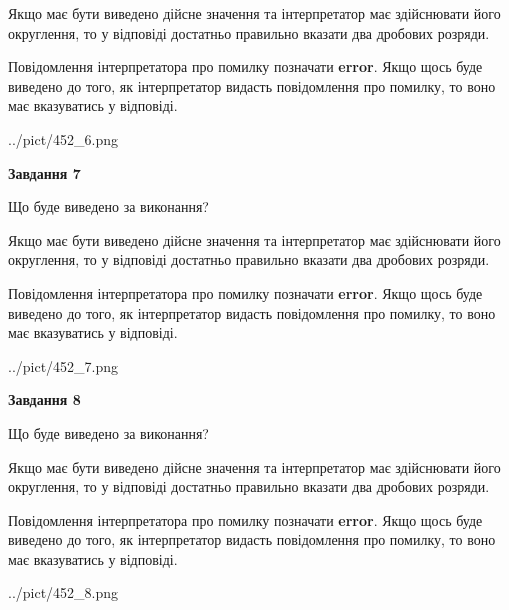 \documentclass[12pt, ukrainian]{article}
\begin{document}
{\begin {Large}
Якщо має бути виведено дійсне значення та інтерпретатор має здійснювати його округлення, 
то у відповіді достатньо правильно вказати два дробових розряди.

Повідомлення інтерпретатора про помилку позначати \textbf{error}.
Якщо щось буде виведено до того, як інтерпретатор видасть повідомлення про помилку, 
то воно має вказуватись у відповіді. \par

\begin{center}
	{../pict/452_6.png}
\end{center}
\newpage

{\begin {center}\textbf{Завдання 7}\end {center}}\par
Що буде виведено за виконання? \par

Якщо має бути виведено дійсне значення та інтерпретатор має здійснювати його округлення, 
то у відповіді достатньо правильно вказати два дробових розряди.

Повідомлення інтерпретатора про помилку позначати \textbf{error}.
Якщо щось буде виведено до того, як інтерпретатор видасть повідомлення про помилку, 
то воно має вказуватись у відповіді. \par

\begin{center}
	{../pict/452_7.png}
\end{center}
\newpage

{\begin {center}\textbf{Завдання 8}\end {center}}\par
Що буде виведено за виконання? \par

Якщо має бути виведено дійсне значення та інтерпретатор має здійснювати його округлення, 
то у відповіді достатньо правильно вказати два дробових розряди.

Повідомлення інтерпретатора про помилку позначати \textbf{error}.
Якщо щось буде виведено до того, як інтерпретатор видасть повідомлення про помилку, 
то воно має вказуватись у відповіді. \par

\begin{center}
	{../pict/452_8.png}
\end{center}
\newpage


\end{Large}}
\end{document}
